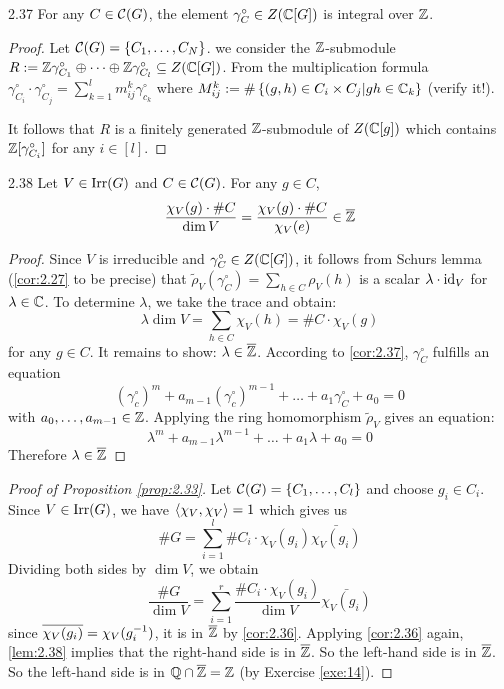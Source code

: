 \documentclass[twoside = false,	%
		headsepline,		%
		parskip = true,
		]{scrbook}						%
\begin{document}
    \begin{corollary}{}{2.37}
        For any $C\in\mathcal C(G)$, the element $\gamma_C^\circ\in Z(\mathbb C[G])$ is integral over $\mathbb Z$.
    \end{corollary}

    \begin{proof}
        Let $\mathcal C(G)=\left\{ C_1,\dots,C_N\right\}$. we consider the $\mathbb Z$-submodule $R:=\mathbb Z\gamma_{C_1}^\circ\oplus\dots\oplus\mathbb Z\gamma_{C_l}^\circ\subseteq Z(\mathbb C[G])$. From the multiplication formula $\gamma_{C_i}^\circ\cdot\gamma_{C_j}^\circ=\sum_{k=1}^lm_{ij}^k\gamma^\circ_{c_k}$ where $M_{ij}^k:=\#\left\{ (g,h)\in C_i\times C_j| gh\in \mathbb C_k\right\}$ (verify it!).

        It follows that $R$ is a finitely generated $\mathbb Z$-submodule of $Z(\mathbb C[g])$ which contains $\mathbb Z[\gamma_{C_i}^\circ]$ for any $i\in [l]$.
    \end{proof}
    
    \begin{lemma}{}{2.38}
        Let $V\in\mathrm{Irr}(G)$ and $C\in\mathcal C(G)$. For any $g\in C$, 
        $$\frac{\chi_V(g)\cdot\#C}{\dim V}=\frac{\chi_V(g)\cdot\#C}{\chi_V(e)}\in\overline{\mathbb Z}$$
        
    \end{lemma}
    
    \begin{proof}
        Since $V$ is irreducible and $\gamma_C^\circ\in Z(\mathbb C[G])$, it follows from Schurs lemma (\ref{cor:2.27} to be precise) that $\tilde\rho_V(\gamma^\circ_C)=\sum_{h\in C}\rho_V(h)$ is a scalar $\lambda\cdot \mathrm{id}_V$ for $\lambda\in\mathbb C$. To determine $\lambda$, we take the trace and obtain:
        $$\lambda\dim V=\sum_{h\in C}\chi_V(h)=\#C \cdot \chi_V(g)$$ for any $g\in C$. It remains to show: $\lambda \in\overline {\mathbb Z}$.
        According to \ref{cor:2.37}, $\gamma_C^\circ$ fulfills an equation
        $$(\gamma_c^\circ)^m+a_{m-1}(\gamma_c^\circ)^{m-1}+\dots+ a_1\gamma_C^\circ+a_0=0$$
        with $a_0,\dots,a_{m-1}\in\mathbb Z$. Applying the ring homomorphism $\tilde\rho_V$ gives an equation:
        $$\lambda^m+a_{m-1}\lambda^{m-1}+\dots+a_1\lambda+a_0=0$$
        Therefore $\lambda\in\overline{\mathbb Z}$
    \end{proof}

    \begin{proof}[Proof of Proposition \ref{prop:2.33}]
        Let $\mathcal C(G)=\left\{ C_1,\dots,C_l\right\}$ and choose $g_i\in C_i$. Since $V\in\mathrm{Irr}(G)$, we have $\left\langle \chi_V,\chi_V\right\rangle=1$ which gives us $$\#G=\sum_{i=1}^l\#C_i\cdot \chi_V(g_i)\bar{\chi_V(g_i)}$$
        Dividing both sides by $\dim V$, we obtain $$\frac{\#G}{\dim V}=\sum_{i=1}^r\frac{\# C_i\cdot\chi_V(g_i)}{\dim V}\bar{\chi_V(g_i)}$$
        since $\overline{\chi_V(g_i)}=\chi_V(g_i^{-1})$, it is in $\overline {\mathbb Z}$ by \ref{cor:2.36}.
        Applying \ref{cor:2.36} again, \ref{lem:2.38} implies that the right-hand side is in $\overline {\mathbb Z}$. So the left-hand side is in $\overline{\mathbb Z}$. So the left-hand side is in $\mathbb Q\cap\overline{\mathbb Z}=\mathbb Z$ (by Exercise \ref{exe:14}).
    \end{proof}
    
\end{document}
